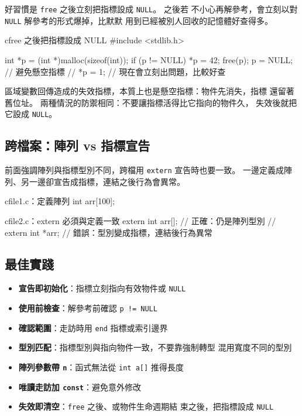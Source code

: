 好習慣是 \texttt{free} 之後立刻把指標設成 \texttt{NULL}。 之後若
不小心再解參考，會立刻以對 \texttt{NULL} 解參考的形式爆掉，比默默
用到已經被別人回收的記憶體好查得多。

\begin{code}{c}{free 之後把指標設成 NULL}
#include <stdlib.h>

int *p = (int *)malloc(sizeof(int));
if (p != NULL) {
    *p = 42;
    free(p);
    p = NULL;     // 避免懸空指標
    // *p = 1;    // 現在會立刻出問題，比較好查
}
\end{code}

區域變數回傳造成的失效指標，本質上也是懸空指標：物件先消失，指標
還留著舊位址。 兩種情況的防禦相同：不要讓指標活得比它指向的物件久，
失效後就把它設成 \texttt{NULL}。

\subsection{跨檔案：陣列 vs 指標宣告}

前面強調陣列與指標型別不同，跨檔用 \texttt{extern} 宣告時也要一致。
一邊定義成陣列、另一邊卻宣告成指標，連結之後行為會異常。

\begin{code}{c}{file1.c：定義陣列}
int arr[100];
\end{code}

\begin{code}{c}{file2.c：extern 必須與定義一致}
extern int arr[];    // 正確：仍是陣列型別
// extern int *arr;  // 錯誤：型別變成指標，連結後行為異常
\end{code}

\subsection{最佳實踐}

\begin{itemize}
\item \textbf{宣告即初始化}：指標立刻指向有效物件或 \texttt{NULL}
\item \textbf{使用前檢查}：解參考前確認 \texttt{p != NULL}
\item \textbf{確認範圍}：走訪時用 \texttt{end} 指標或索引邊界
\item \textbf{型別匹配}：指標型別與指向物件一致，不要靠強制轉型
      混用寬度不同的型別
\item \textbf{陣列參數帶 \texttt{n}}：函式無法從 \texttt{int a[]}
      推得長度
\item \textbf{唯讀走訪加 \texttt{const}}：避免意外修改
\item \textbf{失效即清空}：\texttt{free} 之後、或物件生命週期結
      束之後，把指標設成 \texttt{NULL}
\end{itemize}

